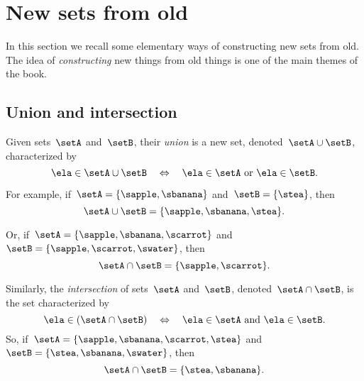
\section{New sets from old}

In this section we recall some elementary ways of constructing new sets from old.
% 
The idea of \emph{constructing} new things from old things is one of the main themes of the book.

\subsection{Union and intersection}

Given sets~$\setA$ and~$\setB$, their \emph{union} is a new set, denoted~$\setA \cup \setB$, characterized by
\begin{equation*}
    \ela \in \setA \cup \setB \quad \Leftrightarrow \quad \ela \in \setA \ \text{or} \ \ela \in \setB.
\end{equation*}

For example, if~$\setA = \{ \sapple, \sbanana \}$ and~$\setB = \{ \stea \}$, then
\begin{equation*}
    \setA \cup \setB = \{ \sapple, \sbanana, \stea \}.
\end{equation*}

Or, if~$\setA = \{ \sapple, \sbanana, \scarrot \}$ and~$\setB = \{ \sapple, \scarrot, \swater \}$, then
\begin{equation*}
    \setA \cap \setB = \{ \sapple, \scarrot \}.
\end{equation*}

Similarly, the \emph{intersection} of sets~$\setA$ and~$\setB$, denoted~$\setA \cap \setB$, is the set characterized by
\begin{equation*}
    \ela \in (\setA \cap \setB) \quad \Leftrightarrow \quad \ela \in \setA \ \text{and} \ \ela \in \setB.
\end{equation*}
So, if~$\setA = \{ \sapple, \sbanana, \scarrot, \stea \}$ and~$\setB = \{ \stea, \sbanana, \swater \}$, then
\begin{equation*}
    \setA \cap \setB = \{ \stea, \sbanana \}.
\end{equation*}


